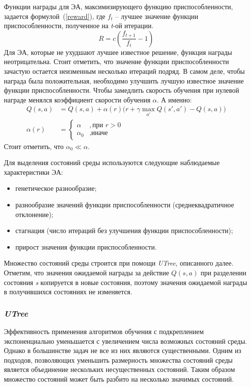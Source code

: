 Функции награды для ЭА, максимизирующего функцию приспособленности, задается формулой~(\ref{reward}), где $f_t$ -- лучшее значение функции приспособленности, полученное на \textit{t}-ой итерации.
\begin{equation}
\label{reward}
R = c(\frac{f_{t+1}}{f_t} - 1)
\end{equation}
Для ЭА, которые не ухудшают лучшее известное решение, функция награды неотрицательна. Стоит отметить, что значение функции приспособленности зачастую остается неизменным несколько итераций подряд. В самом деле, чтобы награда была положительная, необходимо улучшить лучшую известное значение функции приспособленности. Чтобы замедлить скорость обучения при нулевой награде менялся коэффициент скорости обучения $\alpha$. А именно:
\begin{align*}
Q(s,a) &= Q(s,a) + \alpha(r)(r + \gamma \max_{a'}{Q(s',a') - Q(s, a))} \\
\alpha(r) &= \begin{cases}\alpha&, \text{при } r > 0 \\ \alpha_0&, \text{иначе} \end{cases}
\end{align*}
Стоит отметить, что $\alpha_0 \ll \alpha$.

Для выделения состояний среды используются следующие наблюдаемые характеристики ЭА:
\begin{itemize}
    \item генетическое разнообразие;
    \item разнообразие значений функции приспособленности (среднеквадратичное отклонение);
    \item стагнация (число итераций без улучшения функции приспособленности);
    \item прирост значения функции приспособленности.
\end{itemize}

Множество состояний среды строится при помощи \textit{UTree}, описанного далее. Отметим, что значения ожидаемой награды за действие $Q(s, a)$ при разделении состояния \textit{s} копируется в новые состояния, поэтому значения ожидаемой награды в получившихся состояниях не изменяется.

\subsubsection{\textit{UTree}}
\label{utree}
Эффективность применения алгоритмов обучения с подкреплением экспоненциально уменьшается с увеличением числа возможных состояний среды. Однако в большинстве задач не все из них являются существенными. Одним из подходов, позволяющих уменьшить размерность множества состояний среды является объединение нескольких несущественных состояний. Таким образом множество состояний может быть разбито на несколько значимых состояний. 

